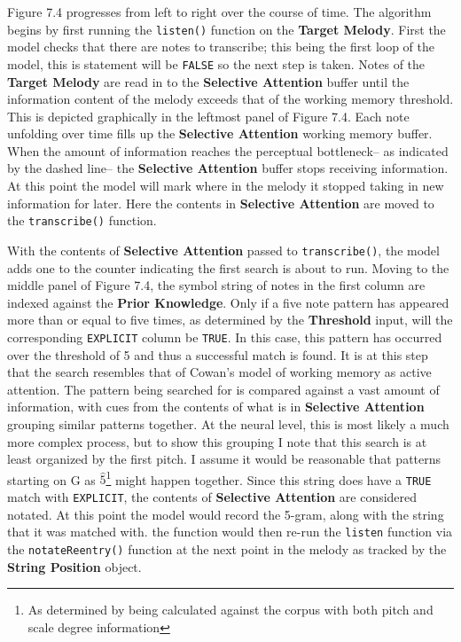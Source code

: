 \documentclass[]{book}
\let\rmarkdownfootnote\footnote%
\def\footnote{\protect\rmarkdownfootnote}
\theoremstyle{definition}
\theoremstyle{definition}
\theoremstyle{definition}
\theoremstyle{remark}
\begin{document}
Figure 7.4 progresses from left to right over the course of time. The
algorithm begins by first running the \texttt{listen()} function on the
\textbf{Target Melody}. First the model checks that there are notes to
transcribe; this being the first loop of the model, this is statement
will be \texttt{FALSE} so the next step is taken. Notes of the
\textbf{Target Melody} are read in to the \textbf{Selective Attention}
buffer until the information content of the melody exceeds that of the
working memory threshold. This is depicted graphically in the leftmost
panel of Figure 7.4. Each note unfolding over time fills up the
\textbf{Selective Attention} working memory buffer. When the amount of
information reaches the perceptual bottleneck-- as indicated by the
dashed line-- the \textbf{Selective Attention} buffer stops receiving
information. At this point the model will mark where in the melody it
stopped taking in new information for later. Here the contents in
\textbf{Selective Attention} are moved to the \texttt{transcribe()}
function.

With the contents of \textbf{Selective Attention} passed to
\texttt{transcribe()}, the model adds one to the counter indicating the
first search is about to run. Moving to the middle panel of Figure 7.4,
the symbol string of notes in the first column are indexed against the
\textbf{Prior Knowledge}. Only if a five note pattern has appeared more
than or equal to five times, as determined by the \textbf{Threshold}
input, will the corresponding \texttt{EXPLICIT} column be \texttt{TRUE}.
In this case, this pattern has occurred over the threshold of 5 and thus
a successful match is found. It is at this step that the search
resembles that of Cowan's model of working memory as active attention.
The pattern being searched for is compared against a vast amount of
information, with cues from the contents of what is in \textbf{Selective
Attention} grouping similar patterns together. At the neural level, this
is most likely a much more complex process, but to show this grouping I
note that this search is at least organized by the first pitch. I assume
it would be reasonable that patterns starting on G as
\(\hat{5}\)\footnote{As determined by being calculated against the
  corpus with both pitch and scale degree information} might happen
together. Since this string does have a \texttt{TRUE} match with
\texttt{EXPLICIT}, the contents of \textbf{Selective Attention} are
considered notated. At this point the model would record the 5-gram,
along with the string that it was matched with. the function would then
re-run the \texttt{listen} function via the \texttt{notateReentry()}
function at the next point in the melody as tracked by the
\textbf{String Position} object.
\end{document}
